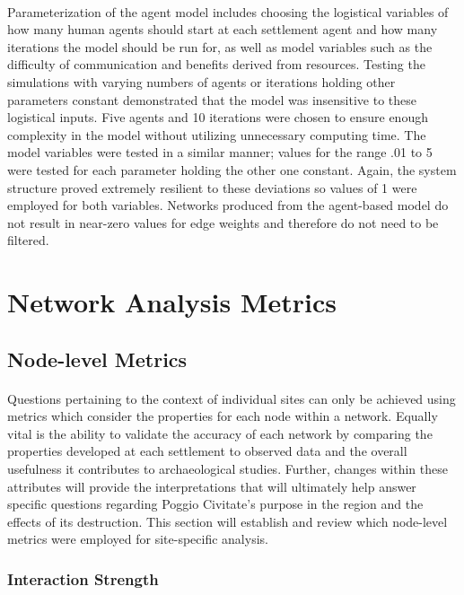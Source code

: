 \documentclass[12pt,a4paper]{thesis}
\begin{document}
\paragraph{}
Parameterization of the agent model includes choosing the logistical variables of how many human agents should start at each settlement agent and how many iterations the model should be run for, as well as model variables such as the difficulty of communication and benefits derived from resources. Testing the simulations with varying numbers of agents or iterations holding other parameters constant demonstrated that the model was insensitive to these logistical inputs. Five agents and 10 iterations were chosen to ensure enough complexity in the model without utilizing unnecessary computing time. The model variables were tested in a similar manner; values for the range .01 to 5 were tested for each parameter holding the other one constant. Again, the system structure proved extremely resilient to these deviations so values of 1 were employed for both variables. Networks produced from the agent-based model do not result in near-zero values for edge weights and therefore do not need to be filtered.   

\section{Network Analysis Metrics}

\subsection{Node-level Metrics}

\paragraph{}
Questions pertaining to the context of individual  sites can only be achieved using metrics which consider the properties for each node within a network. Equally vital is the ability to validate the accuracy of each network by comparing the properties developed at each settlement to observed data and the overall usefulness it contributes to archaeological studies. Further, changes within these attributes will provide the interpretations that will ultimately help answer specific questions regarding Poggio Civitate's purpose in the region and the effects of its destruction. This section will establish and review which node-level metrics were employed for site-specific analysis.


\subsubsection{Interaction Strength}
\end{document}
